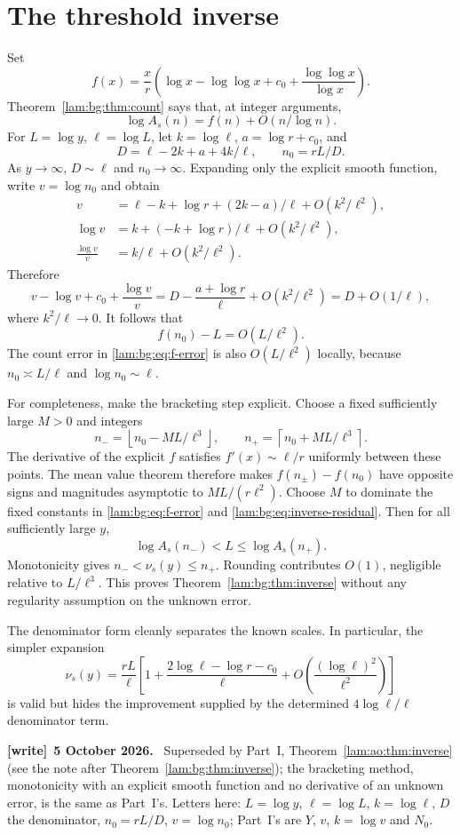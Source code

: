 \documentclass[11pt,a4paper]{article}
\numberwithin{equation}{section}
\theoremstyle{remark}
\newenvironment{writenote}[1][]{\par\smallskip\begingroup\small
 \noindent\textbf{[write]}\if\relax\detokenize{#1}\relax\else~\textbf{#1.}\fi\ }%
 {\par\endgroup\smallskip}
\begin{document}
\section{The threshold inverse}\label{lam:bg:sec:inverse}
Set
\[
 f(x)=\frac xr\left(\log x-\log\log x+c_0
              +\frac{\log\log x}{\log x}\right).
\]
Theorem~\ref{lam:bg:thm:count} says that, at integer arguments,
\begin{equation}\label{lam:bg:eq:f-error}
 \log A_s(n)=f(n)+O(n/\log n).
\end{equation}
For $L=\log y$, $\ell=\log L$, let $k=\log\ell$, $a=\log r+c_0$, and
\[
 D=\ell-2k+a+4k/\ell,\qquad n_0=rL/D.
\]
As $y\to\infty$, $D\sim\ell$ and $n_0\to\infty$. Expanding only the explicit smooth function, write $v=\log n_0$ and obtain
\begin{align*}
 v&=\ell-k+\log r+(2k-a)/\ell+O(k^2/\ell^2),\\
 \log v&=k+(-k+\log r)/\ell+O(k^2/\ell^2),\\
 \frac{\log v}{v}&=k/\ell+O(k^2/\ell^2).
\end{align*}
Therefore
\[
 v-\log v+c_0+\frac{\log v}{v}
   =D-\frac{a+\log r}{\ell}+O(k^2/\ell^2)
   =D+O(1/\ell),
\]
where $k^2/\ell\to0$. It follows that
\begin{equation}\label{lam:bg:eq:inverse-residual}
 f(n_0)-L=O(L/\ell^2).
\end{equation}
The count error in \eqref{lam:bg:eq:f-error} is also $O(L/\ell^2)$ locally, because $n_0\asymp L/\ell$ and $\log n_0\sim\ell$.

For completeness, make the bracketing step explicit. Choose a fixed sufficiently large $M>0$ and integers
\[
 n_- =\left\lfloor n_0-M L/\ell^3\right\rfloor,
 \qquad
 n_+ =\left\lceil n_0+M L/\ell^3\right\rceil.
\]
The derivative of the explicit $f$ satisfies $f'(x)\sim\ell/r$ uniformly between these points. The mean value theorem therefore makes $f(n_\pm)-f(n_0)$ have opposite signs and magnitudes asymptotic to $ML/(r\ell^2)$. Choose $M$ to dominate the fixed constants in \eqref{lam:bg:eq:f-error} and \eqref{lam:bg:eq:inverse-residual}. Then for all sufficiently large $y$,
\[
 \log A_s(n_-)<L\le\log A_s(n_+).
\]
Monotonicity gives $n_-<\nu_s(y)\le n_+$. Rounding contributes $O(1)$, negligible relative to $L/\ell^3$. This proves Theorem~\ref{lam:bg:thm:inverse} without any regularity assumption on the unknown error.

The denominator form cleanly separates the known scales. In particular, the simpler expansion
\[
 \nu_s(y)=\frac{rL}{\ell}
 \left[1+\frac{2\log\ell-\log r-c_0}{\ell}
       +O\!\left(\frac{(\log\ell)^2}{\ell^2}\right)\right]
\]
is valid but hides the improvement supplied by the determined $4\log\ell/\ell$ denominator term.
\begin{writenote}[5 October 2026]
Superseded by Part~I, Theorem~\ref{lam:ao:thm:inverse} (see the note after Theorem~\ref{lam:bg:thm:inverse}); the bracketing method, monotonicity with an explicit smooth function and no derivative of an unknown error, is the same as Part~I's. Letters here: $L=\log y$, $\ell=\log L$, $k=\log\ell$, $D$ the denominator, $n_0=rL/D$, $v=\log n_0$; Part~I's are $Y$, $v$, $k=\log v$ and $N_0$.
\end{writenote}
\end{document}
